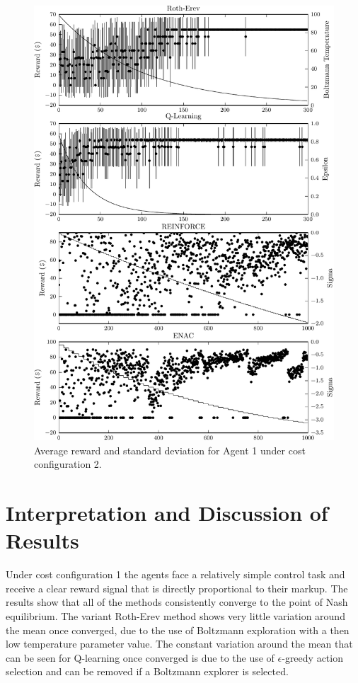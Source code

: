{\begin{figure}
	  \includegraphics{figures/fig5_2_reward_a1}
	  \caption{Average reward and standard deviation for Agent 1 under cost
	  configuration 2.}
	  \label{fig:5_2_reward_a1}
	\end{figure}
}{}

\section{Interpretation and Discussion of Results}
Under cost configuration 1 the agents face a relatively simple control task and
receive a clear reward signal that is directly proportional to their markup. The
results show that all of the methods consistently converge to the point of Nash
equilibrium.  The variant Roth-Erev method shows very little variation around
the mean once converged, due to the use of Boltzmann exploration with a then low
temperature parameter value.  The constant variation around the mean that can be
seen for Q-learning once converged is due to the use of $\epsilon$-greedy action
selection and can be removed if a Boltzmann explorer is selected.

